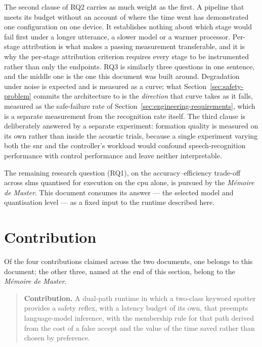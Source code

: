 The second clause of RQ2 carries as much weight as the first. A pipeline that meets its budget
without an account of where the time went has demonstrated one configuration on one device. It
establishes nothing about which stage would fail first under a longer utterance, a slower model or
a warmer processor. Per-stage attribution is what makes a passing measurement transferable, and it
is why the per-stage attribution criterion requires every stage to be instrumented rather than only
the endpoints. RQ3 is similarly three questions in one sentence, and the middle one is the one
this document was built around. Degradation under noise is expected and is measured as a curve;
what Section~\ref{sec:safety-problem} commits the architecture to is the \emph{direction} that
curve takes as it falls, measured as the safe-failure rate of
Section~\ref{sec:engineering-requirements}, which is a separate measurement from the recognition
rate itself. The third clause is deliberately answered by a separate experiment: formation quality
is measured on its own rather than inside the acoustic trials, because a single experiment varying
both the \gls{snr} and the controller's workload would confound speech-recognition performance with
control performance and leave neither interpretable.

The remaining research question (RQ1), on the accuracy--efficiency trade-off across \glspl{slm}
quantised for execution on the \gls{cpu} alone, is pursued by the \emph{M\'emoire de Master}. This
document consumes its answer --- the selected model and quantisation level --- as a fixed input to
the runtime described here.

\section{Contribution}
\label{sec:contributions}
Of the four contributions claimed across the two documents, one belongs to this document; the
other three, named at the end of this section, belong to the \emph{M\'emoire de Master}.

\begin{quote}
\textbf{Contribution.} A dual-path runtime in which a two-class keyword spotter provides a safety
reflex, with a latency budget of its own, that preempts language-model inference, with the
membership rule for that path derived from the cost of a false accept and the value of the time
saved rather than chosen by preference.
\end{quote}

